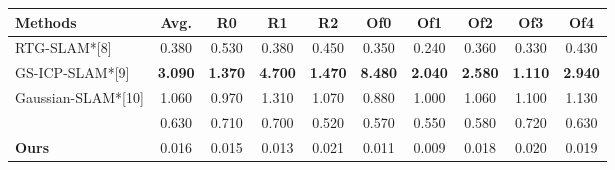 \documentclass[twocolumn]{article} %
\begin{document}
\begin{table}[htbp]
\renewcommand{\thetable}{\textbf{\arabic{table}}}
\renewcommand{\tablename}{\textbf{Table}}
\centering
\begin{adjustbox}{max width=\columnwidth,max height=!,center}
\begin{tabular}{lccccccccc}
\toprule
\textbf{Methods} & \textbf{Avg.} & \textbf{R0} & \textbf{R1} & \textbf{R2} & \textbf{Of0} & \textbf{Of1} & \textbf{Of2} & \textbf{Of3} & \textbf{Of4}\\
\midrule
RTG-SLAM*[8] & 0.380 & 0.530 & 0.380 & 0.450 & 0.350 & 0.240 & 0.360 & 0.330 & 0.430\\
GS-ICP-SLAM*[9] & \cellcolor{green!30}\textbf{3.090} & \cellcolor{green!30}\textbf{1.370} & \cellcolor{green!30}\textbf{4.700} & \cellcolor{green!30}\textbf{1.470} & \cellcolor{green!30}\textbf{8.480} & \cellcolor{green!30}\textbf{2.040} & \cellcolor{green!30}\textbf{2.580} & \cellcolor{green!30}\textbf{1.110} & \cellcolor{green!30}\textbf{2.940}\\
Gaussian-SLAM*[10] & \cellcolor{yellow!30}1.060 & \cellcolor{yellow!30}0.970 & \cellcolor{yellow!30}1.310 & \cellcolor{yellow!30}1.070 & \cellcolor{yellow!30}0.880 & \cellcolor{yellow!30}1.000 & \cellcolor{yellow!30}1.060 & \cellcolor{yellow!30}1.100 & \cellcolor{yellow!30}1.130\\
 & \cellcolor{lime!50}0.630 & \cellcolor{lime!50}0.710 & \cellcolor{lime!50}0.700 & \cellcolor{lime!50}0.520 & \cellcolor{lime!50}0.570 & \cellcolor{lime!50}0.550 & \cellcolor{lime!50}0.580 & \cellcolor{lime!50}0.720 & \cellcolor{lime!50}0.630\\
\midrule
\textbf{Ours} & 0.016 & 0.015 & 0.013 & 0.021 & 0.011 & 0.009 & 0.018 & 0.020 & 0.019\\
\bottomrule
\end{tabular}
\end{adjustbox}
\end{table}
\end{document}
